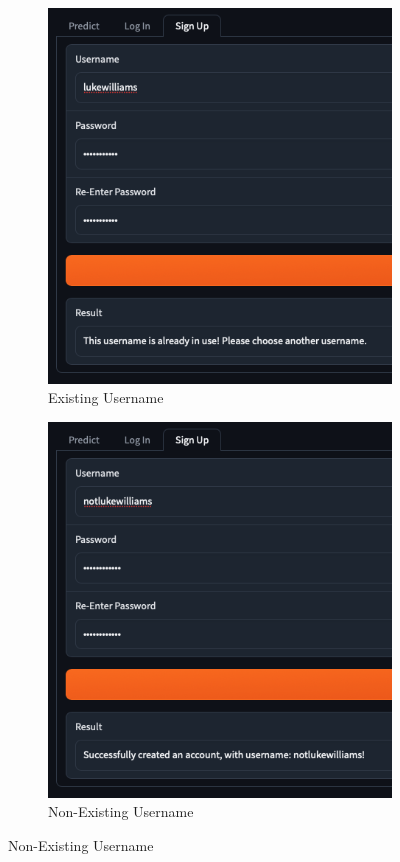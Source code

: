 \documentclass[12pt]{report}
\begin{document}
\begin{figure}[H]
\centering
\begin{subfigure}{.45\linewidth}
    \centering
    \includegraphics[width=\linewidth]{ss15.7a.png}
    \caption{Existing Username}
\end{subfigure}
\begin{subfigure}{.45\linewidth}
    \centering
    \includegraphics[width=\linewidth]{ss15.7b.png}
    \caption{Non-Existing Username}
\end{subfigure}


\end{figure}
\end{document}
